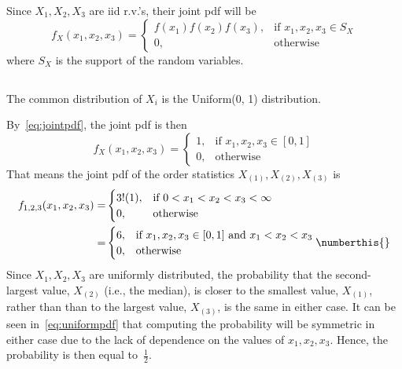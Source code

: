 \documentclass[hwnumber=3,studentnumber=20053722]{mthe353answer}
\begin{document}
  \begin{questions}
    \setcounter{question}{2}
    \question{}
    \begin{note}
      Since \(X_1, X_2, X_3\) are iid r.v.'s, their joint pdf will be
      \begin{equation}
        \label{eq:jointpdf}
        f_X(x_1,x_2, x_3) =
        \begin{cases}
          f(x_1)f(x_2)f(x_3), & \text{if } x_1, x_2, x_3 \in S_X\\
          0, & \text{otherwise}
        \end{cases}
      \end{equation}
      where \(S_X\) is the support of the random variables.
    \end{note}
    \begin{parts}
      \part{}
      The common distribution of \(X_i\) is the Uniform(0, 1) distribution.
      \begin{solution}
        By~\eqref{eq:jointpdf}, the joint pdf is then
        \begin{equation*}
          f_X(x_1, x_2, x_3) =
          \begin{cases}
            1, & \text{if } x_1, x_2, x_3 \in [0, 1]\\
            0, & \text{otherwise}
          \end{cases}
        \end{equation*}
        That means the joint pdf of the order statistics \(X_{(1)}, X_{(2)},
        X_{(3)}\) is
        \begin{align*}
          f_{1, 2, 3}(x_1, x_2, x_3) =&
          \begin{cases}
            3!(1), & \text{if } 0 < x_1 < x_2 < x_3 < \infty\\
            0, & \text{otherwise}
          \end{cases}\\
          =&
          \begin{cases}
            6, & \text{if } x_1, x_2, x_3 \in [0, 1] \text{ and } x_1 < x_2 < x_3\\
            0, & \text{otherwise}
          \end{cases} \label{eq:uniformpdf} \numberthis{}
        \end{align*}
        Since \(X_1, X_2, X_3\) are uniformly distributed, the probability that
        the second-largest value, \(X_{(2)}\) (i.e., the median), is closer to the smallest
        value, \(X_{(1)}\), rather than than to the largest value, \(X_{(3)}\),
        is the same in either case. It can be seen in~\eqref{eq:uniformpdf} that
        computing the probability will be symmetric in either case due to the lack
        of dependence on the values of \(x_1, x_2, x_3\). Hence, the probability
         is then equal to~\(\boxed{\frac{1}{2}}\).
      \end{solution}

\end{parts}
\end{questions}
\end{document}
